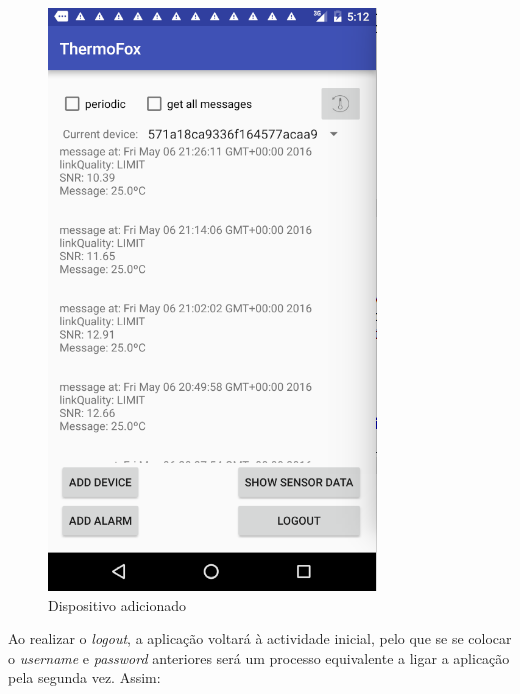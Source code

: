 \documentclass[a4paper]{article}
\begin{document}
\begin{figure}[H]
  \includegraphics[width=\linewidth]{logss.png}
  \caption{Dispositivo adicionado}\label{fig:b}
\endminipage\hfill
\end{figure}

Ao realizar o \textit{logout}, a aplicação voltará à actividade inicial, pelo que se se colocar o \textit{username} e \textit{password} anteriores será um processo equivalente a ligar a aplicação pela segunda vez. Assim:
\end{document}

